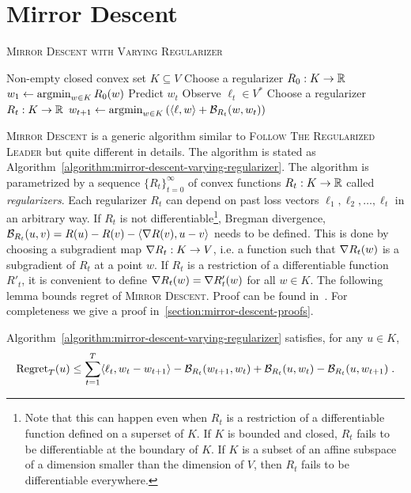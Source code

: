 \section{Mirror Descent}
\label{section:mirror-descent}

\begin{algorithm}[t]
\caption{\textsc{Mirror Descent with Varying Regularizer}}
\label{algorithm:mirror-descent-varying-regularizer}
\begin{algorithmic}[1]
\REQUIRE Non-empty closed convex set $K \subseteq V$
\STATE Choose a regularizer $R_0:K \to \mathbb{R}$
\STATE $w_1 \leftarrow \operatorname*{argmin}_{w \in K} R_0(w)$
\STATE Predict $w_t$
\STATE Observe $\ell_t \in V^*$
\STATE Choose a regularizer $R_t:K \to \mathbb{R}$
\STATE $w_{t+1} \leftarrow \operatorname*{argmin}_{w \in K} \left( \langle \ell, w \rangle + \mathcal{B}_{R_t}(w, w_t) \right)$
\ENDFOR
\end{algorithmic}
\end{algorithm}


\textsc{Mirror Descent} is a generic algorithm similar to \textsc{Follow The
Regularized Leader} but quite different in details. The algorithm is stated as
Algorithm~\ref{algorithm:mirror-descent-varying-regularizer}. The algorithm is
parametrized by a sequence $\{R_t\}_{t=0}^\infty$ of convex functions $R_t:K
\to \mathbb{R}$ called \emph{regularizers}. Each regularizer $R_t$ can depend on past
loss vectors $\ell_1, \ell_2, \dots, \ell_t$ in an arbitrary way. If $R_t$ is
not differentiable\footnote{Note that this can happen even when $R_t$ is a
restriction of a differentiable function defined on a superset of $K$.  If $K$
is bounded and closed, $R_t$ fails to be differentiable at the boundary of $K$.
If $K$ is a subset of an affine subspace of a dimension smaller than the
dimension of $V$, then $R_t$ fails to be differentiable everywhere.}, Bregman
divergence, $\mathcal{B}_{R_t}(u,v) = R(u) - R(v) - \langle \nabla R(v), u - v
\rangle$ needs to be defined. This is done by choosing a subgradient map $\nabla
R_t:K \to V$, i.e. a function such that $\nabla R_t(w)$ is a subgradient of
$R_t$ at a point $w$. If $R_t$ is a restriction of a differentiable function
$R'_t$, it is convenient to define $\nabla R_t(w) = \nabla R'_t(w)$ for all $w
\in K$. The following lemma bounds regret of \textsc{Mirror Descent}.  Proof
can be found in~\cite{Rakhlin-Sridharan-2009,Duchi-Shalev-Shwartz-Singer-Tewari-2010}.
For completeness we give a proof in~\ref{section:mirror-descent-proofs}.

\begin{lemma}
\label{lemma:mirror-descent-regret}
Algorithm~\ref{algorithm:mirror-descent-varying-regularizer} satisfies, for any
$u \in K$,
$$
\operatorname{Regret}_T(u)
\le
\sum_{t=1}^T \langle \ell_t, w_t - w_{t+1} \rangle - \mathcal{B}_{R_t}(w_{t+1}, w_t) + \mathcal{B}_{R_t}(u,w_t) - \mathcal{B}_{R_t}(u, w_{t+1}) \; .
$$
\end{lemma}

